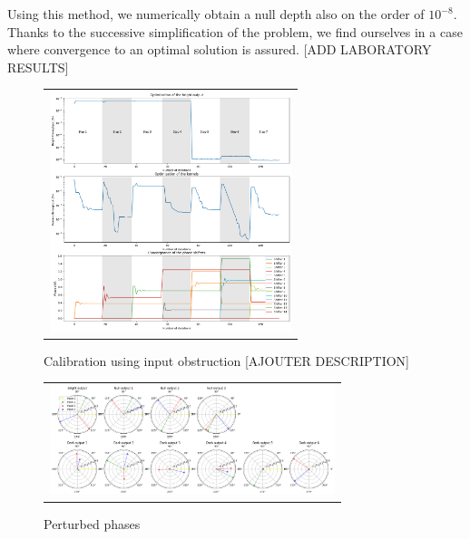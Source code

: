 \documentclass{aa}
\begin{document}
            Using this method, we numerically obtain a null depth also on the order of $10^{-8}$. Thanks to the successive simplification of the problem, we find ourselves in a case where convergence to an optimal solution is assured. [ADD LABORATORY RESULTS]

            \begin{figure}[H]
                \begin{center}
                \begin{tabular}{c}
                \includegraphics[height=7cm]{img/calibration_obstruction.png}
                \end{tabular}
                \end{center}
                \caption[calibration_obstruction] 
                { \label{fig:calibration_obstruction} 
                Calibration using input obstruction [AJOUTER DESCRIPTION]}
            \end{figure}

    \begin{figure}[H]
        \begin{center}
        \begin{tabular}{c}
        \includegraphics[height=3.2cm]{img/perturbed_phases.png}
        \end{tabular}
        \end{center}
        \caption[perturbed_phases] 
        { \label{fig:perturbed_phases} 
        Perturbed phases}
    \end{figure}
\end{document}
